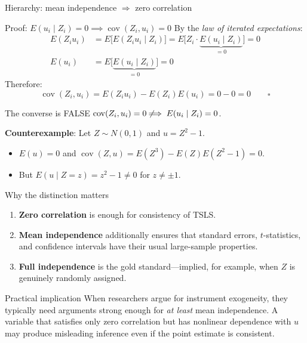 \documentclass[10pt]{beamer}
\begin{document}
\begin{frame}{Hierarchy: mean independence $\Rightarrow$ zero correlation}
\label{slide:exogeneity_proof}
\begin{block}{Proof: $E(u_i \mid Z_i)=0 \implies \operatorname{cov}(Z_i, u_i)=0$}
By the \emph{law of iterated expectations}:
\begin{align*}
E(Z_i u_i) &= E\bigl[E(Z_i u_i \mid Z_i)\bigr] = E\bigl[Z_i \cdot \underbrace{E(u_i \mid Z_i)}_{=0}\bigr] = 0 \\[4pt]
E(u_i) &= E\bigl[\underbrace{E(u_i \mid Z_i)}_{=0}\bigr] = 0
\end{align*}
Therefore:
\[
\operatorname{cov}(Z_i, u_i) = E(Z_i u_i) - E(Z_i)E(u_i) = 0 - 0 = 0 \qquad \square
\]
\end{block}

\pause
\begin{alertblock}{The converse is FALSE}
$\operatorname{cov}(Z_i, u_i) = 0 \not\!\!\implies E(u_i \mid Z_i) = 0$.

\vspace{0.3em}
\textbf{Counterexample}: Let $Z \sim N(0,1)$ and $u = Z^2 - 1$.
\begin{itemize}
  \item $E(u) = 0$ and $\operatorname{cov}(Z, u) = E(Z^3) - E(Z)E(Z^2-1) = 0$. \checkmark
  \item But $E(u \mid Z=z) = z^2 - 1 \neq 0$ for $z \neq \pm 1$. 
\end{itemize}
\end{alertblock}
\end{frame}

\begin{frame}{Why the distinction matters}
\label{slide:exogeneity_why}
\begin{enumerate}
  \item \textbf{Zero correlation} is enough for \alert{consistency} of TSLS.
  \item \textbf{Mean independence} additionally ensures that standard errors, $t$-statistics, and confidence intervals have their usual large-sample properties.
  \item \textbf{Full independence} is the gold standard---implied, for example, when $Z$ is genuinely randomly assigned.
\end{enumerate}

\pause
\vspace{0.5em}
\begin{exampleblock}{Practical implication}
When researchers argue for instrument exogeneity, they typically need arguments strong enough for \emph{at least} mean independence. A variable that satisfies only zero correlation but has nonlinear dependence with $u$ may produce misleading inference even if the point estimate is consistent.
\end{exampleblock}
\end{frame}
\end{document}
